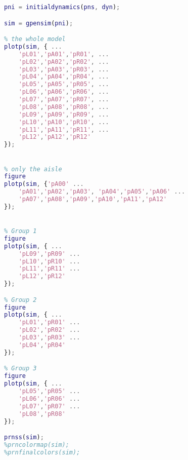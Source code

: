\begin{lstlisting}[language=MATLAB, caption=wilmablock.m]
pni = initialdynamics(pns, dyn);

sim = gpensim(pni);

% the whole model
plotp(sim, { ...
    'pL01','pA01','pR01', ...
    'pL02','pA02','pR02', ...
    'pL03','pA03','pR03', ...
    'pL04','pA04','pR04', ...
    'pL05','pA05','pR05', ...
    'pL06','pA06','pR06', ...
    'pL07','pA07','pR07', ...
    'pL08','pA08','pR08', ...
    'pL09','pA09','pR09', ...
    'pL10','pA10','pR10', ...
    'pL11','pA11','pR11', ...
    'pL12','pA12','pR12'
});


% only the aisle
figure
plotp(sim, {'pA00' ...
    'pA01','pA02','pA03', 'pA04','pA05','pA06' ...
    'pA07','pA08','pA09','pA10','pA11','pA12'
});


% Group 1
figure
plotp(sim, { ...
    'pL09','pR09' ...
    'pL10','pR10' ...
    'pL11','pR11' ...
    'pL12','pR12'
});

% Group 2
figure
plotp(sim, { ...
    'pL01','pR01' ...
    'pL02','pR02' ...
    'pL03','pR03' ...
    'pL04','pR04'
});

% Group 3
figure
plotp(sim, { ...
    'pL05','pR05' ...
    'pL06','pR06' ...
    'pL07','pR07' ...
    'pL08','pR08'
});

prnss(sim);
%prncolormap(sim);
%prnfinalcolors(sim);
\end{lstlisting}

